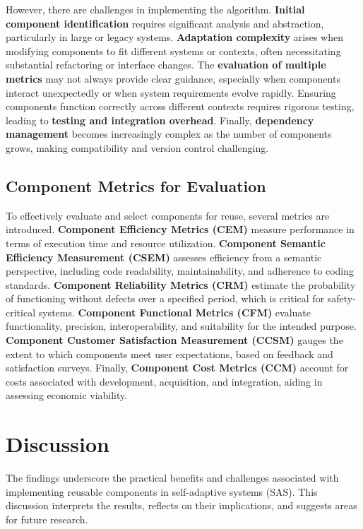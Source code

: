 \documentclass[a4paper,10pt]{article}
\begin{document}
However, there are challenges in implementing the algorithm. \textbf{Initial component identification} requires significant analysis and abstraction, particularly in large or legacy systems. \textbf{Adaptation complexity} arises when modifying components to fit different systems or contexts, often necessitating substantial refactoring or interface changes. The \textbf{evaluation of multiple metrics} may not always provide clear guidance, especially when components interact unexpectedly or when system requirements evolve rapidly. Ensuring components function correctly across different contexts requires rigorous testing, leading to \textbf{testing and integration overhead}. Finally, \textbf{dependency management} becomes increasingly complex as the number of components grows, making compatibility and version control challenging.

\subsection{Component Metrics for Evaluation}

To effectively evaluate and select components for reuse, several metrics are introduced. \textbf{Component Efficiency Metrics (CEM)} measure performance in terms of execution time and resource utilization. \textbf{Component Semantic Efficiency Measurement (CSEM)} assesses efficiency from a semantic perspective, including code readability, maintainability, and adherence to coding standards. \textbf{Component Reliability Metrics (CRM)} estimate the probability of functioning without defects over a specified period, which is critical for safety-critical systems. \textbf{Component Functional Metrics (CFM)} evaluate functionality, precision, interoperability, and suitability for the intended purpose. \textbf{Component Customer Satisfaction Measurement (CCSM)} gauges the extent to which components meet user expectations, based on feedback and satisfaction surveys. Finally, \textbf{Component Cost Metrics (CCM)} account for costs associated with development, acquisition, and integration, aiding in assessing economic viability.


\section{Discussion}

The findings underscore the practical benefits and challenges associated with implementing reusable components in self-adaptive systems (SAS). This discussion interprets the results, reflects on their implications, and suggests areas for future research.
\end{document}
